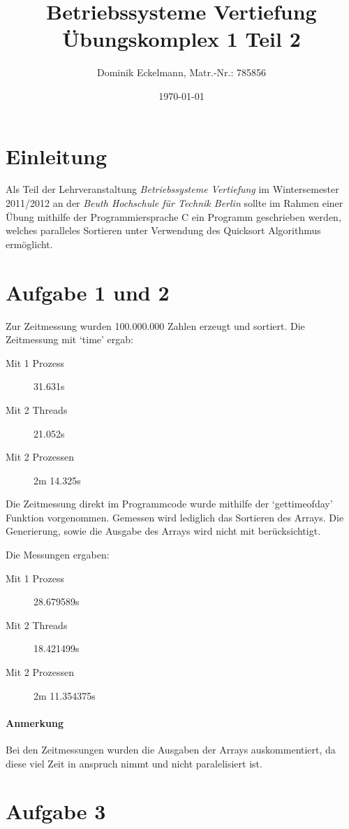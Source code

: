 \documentclass[a4paper]{article}
\title{Betriebssysteme Vertiefung \\ Übungskomplex 1 Teil 2}
\author{Dominik Eckelmann, Matr.-Nr.: 785856}
\date{\today}
\begin{document}
\maketitle

\tableofcontents

\section{Einleitung}
Als Teil der Lehrveranstaltung \textit{Betriebssysteme Vertiefung} im Wintersemester 2011/2012 an der \textit{Beuth Hochschule für Technik Berlin} sollte im Rahmen einer Übung mithilfe der Programmiersprache C ein Programm geschrieben werden, welches paralleles Sortieren unter Verwendung
des Quicksort Algorithmus ermöglicht.

\section{Aufgabe 1 und 2}

Zur Zeitmessung wurden 100.000.000 Zahlen erzeugt und sortiert.
Die Zeitmessung mit `time' ergab:

\begin{description}
\item[Mit 1 Prozess] 31.631s
\item[Mit 2 Threads] 21.052s
\item[Mit 2 Prozessen] 2m 14.325s
\end{description}

Die Zeitmessung direkt im Programmcode wurde mithilfe der `gettimeofday' Funktion vorgenommen.
Gemessen wird lediglich das Sortieren des Arrays.
Die Generierung, sowie die Ausgabe des Arrays wird nicht mit berücksichtigt.

Die Messungen ergaben:
\begin{description}
\item[Mit 1 Prozess] 28.679589s
\item[Mit 2 Threads] 18.421499s
\item[Mit 2 Prozessen] 2m 11.354375s
\end{description}

\paragraph{Anmerkung} Bei den Zeitmessungen wurden die Ausgaben der Arrays auskommentiert,
da diese viel Zeit in anspruch nimmt und nicht paralelisiert ist.

\section{Aufgabe 3}
\end{document}
